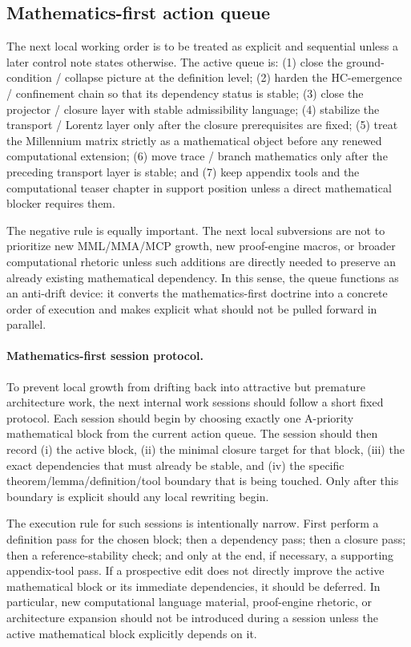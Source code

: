 \subsection*{Mathematics-first action queue}
The next local working order is to be treated as explicit and sequential unless a later control note states otherwise. The active queue is: (1) close the ground-condition / collapse picture at the definition level; (2) harden the HC-emergence / confinement chain so that its dependency status is stable; (3) close the projector / closure layer with stable admissibility language; (4) stabilize the transport / Lorentz layer only after the closure prerequisites are fixed; (5) treat the Millennium matrix strictly as a mathematical object before any renewed computational extension; (6) move trace / branch mathematics only after the preceding transport layer is stable; and (7) keep appendix tools and the computational teaser chapter in support position unless a direct mathematical blocker requires them.

The negative rule is equally important. The next local subversions are not to prioritize new MML/MMA/MCP growth, new proof-engine macros, or broader computational rhetoric unless such additions are directly needed to preserve an already existing mathematical dependency. In this sense, the queue functions as an anti-drift device: it converts the mathematics-first doctrine into a concrete order of execution and makes explicit what should not be pulled forward in parallel.


\paragraph{Mathematics-first session protocol.}
To prevent local growth from drifting back into attractive but premature architecture work, the next internal work sessions should follow a short fixed protocol. Each session should begin by choosing exactly one A-priority mathematical block from the current action queue. The session should then record (i) the active block, (ii) the minimal closure target for that block, (iii) the exact dependencies that must already be stable, and (iv) the specific theorem/lemma/definition/tool boundary that is being touched. Only after this boundary is explicit should any local rewriting begin.

The execution rule for such sessions is intentionally narrow. First perform a definition pass for the chosen block; then a dependency pass; then a closure pass; then a reference-stability check; and only at the end, if necessary, a supporting appendix-tool pass. If a prospective edit does not directly improve the active mathematical block or its immediate dependencies, it should be deferred. In particular, new computational language material, proof-engine rhetoric, or architecture expansion should not be introduced during a session unless the active mathematical block explicitly depends on it.

